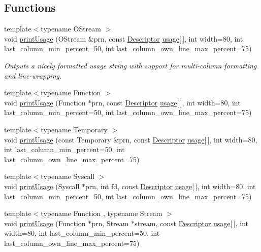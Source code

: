 \subsection*{Functions}
\begin{DoxyCompactItemize}
\item 
{\footnotesize template$<$typename O\-Stream $>$ }\\void \hyperlink{namespace_option_parser_a2458d437c7f439220d0b3581a5db56b1}{print\-Usage} (O\-Stream \&prn, const \hyperlink{struct_option_parser_1_1_descriptor}{Descriptor} \hyperlink{_community_detection_8cpp_ae4e685e845abde182eb8fc1f87b756ae}{usage}\mbox{[}$\,$\mbox{]}, int width=80, int last\-\_\-column\-\_\-min\-\_\-percent=50, int last\-\_\-column\-\_\-own\-\_\-line\-\_\-max\-\_\-percent=75)
\begin{DoxyCompactList}\small\item\em Outputs a nicely formatted usage string with support for multi-\/column formatting and line-\/wrapping. \end{DoxyCompactList}\item 
{\footnotesize template$<$typename Function $>$ }\\void \hyperlink{namespace_option_parser_a5901bd1e298e40bf2907f55cef137036}{print\-Usage} (Function $\ast$prn, const \hyperlink{struct_option_parser_1_1_descriptor}{Descriptor} \hyperlink{_community_detection_8cpp_ae4e685e845abde182eb8fc1f87b756ae}{usage}\mbox{[}$\,$\mbox{]}, int width=80, int last\-\_\-column\-\_\-min\-\_\-percent=50, int last\-\_\-column\-\_\-own\-\_\-line\-\_\-max\-\_\-percent=75)
\item 
{\footnotesize template$<$typename Temporary $>$ }\\void \hyperlink{namespace_option_parser_a8df0d17480241e36488d873a068c69e6}{print\-Usage} (const Temporary \&prn, const \hyperlink{struct_option_parser_1_1_descriptor}{Descriptor} \hyperlink{_community_detection_8cpp_ae4e685e845abde182eb8fc1f87b756ae}{usage}\mbox{[}$\,$\mbox{]}, int width=80, int last\-\_\-column\-\_\-min\-\_\-percent=50, int last\-\_\-column\-\_\-own\-\_\-line\-\_\-max\-\_\-percent=75)
\item 
{\footnotesize template$<$typename Syscall $>$ }\\void \hyperlink{namespace_option_parser_a598e7060eca553d3ff49580521d74794}{print\-Usage} (Syscall $\ast$prn, int fd, const \hyperlink{struct_option_parser_1_1_descriptor}{Descriptor} \hyperlink{_community_detection_8cpp_ae4e685e845abde182eb8fc1f87b756ae}{usage}\mbox{[}$\,$\mbox{]}, int width=80, int last\-\_\-column\-\_\-min\-\_\-percent=50, int last\-\_\-column\-\_\-own\-\_\-line\-\_\-max\-\_\-percent=75)
\item 
{\footnotesize template$<$typename Function , typename Stream $>$ }\\void \hyperlink{namespace_option_parser_a4dc729b794dd3528f776e41c2d2b5b3e}{print\-Usage} (Function $\ast$prn, Stream $\ast$stream, const \hyperlink{struct_option_parser_1_1_descriptor}{Descriptor} \hyperlink{_community_detection_8cpp_ae4e685e845abde182eb8fc1f87b756ae}{usage}\mbox{[}$\,$\mbox{]}, int width=80, int last\-\_\-column\-\_\-min\-\_\-percent=50, int last\-\_\-column\-\_\-own\-\_\-line\-\_\-max\-\_\-percent=75)
\end{DoxyCompactItemize}


